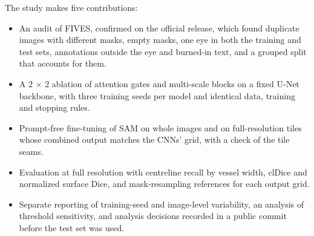 The study makes five contributions:
\begin{itemize}
\item An audit of FIVES, confirmed on the official release, which found duplicate images with different masks, empty masks, one eye in both
the training and test sets, annotations outside the eye and burned-in text, and a grouped split that accounts for them.
\item A 2 $\times$ 2 ablation of attention gates and multi-scale blocks on a fixed U-Net backbone, with three training seeds
per model and identical data, training and stopping rules.
\item Prompt-free fine-tuning of SAM on whole images and on full-resolution tiles whose combined output matches the CNNs'
grid, with a check of the tile seams.
\item Evaluation at full resolution with centreline recall by vessel width, clDice and normalized surface Dice, and
mask-resampling references for each output grid.
\item Separate reporting of training-seed and image-level variability, an analysis of threshold sensitivity, and analysis
decisions recorded in a public commit before the test set was used.
\end{itemize}
